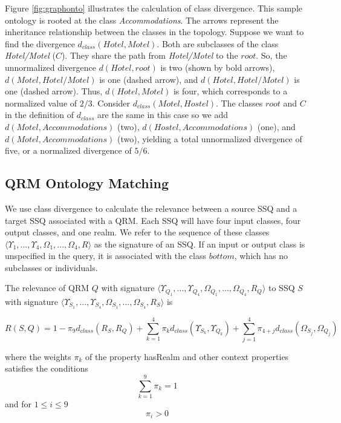 \documentclass{IOS-Book-Article}
\begin{document}
Figure \ref{fig:graphonto} illustrates the calculation of class divergence. This sample ontology is rooted at the class \textit{Accommodations}. The arrows represent the inheritance relationship between the classes in the topology.
Suppose we want to find the divergence $d_{class}(Hotel,Motel)$. Both are subclasses of the class \textit{Hotel/Motel} ($C$). They share the path from \textit{Hotel/Motel} to the $root$. So, the unnormalized divergence $d(Hotel, root)$ is two (shown by bold arrows), $d(Motel, Hotel/Motel)$ is one (dashed arrow), and $d(Hotel, Hotel/Motel)$ is one (dashed arrow). Thus, $d(Hotel, Motel)$ is four, which corresponds to a normalized value of $2/3$. 
Consider $d_{class}(Motel,Hostel)$. The classes $root$ and $C$ in the definition of $d_{class}$ are the same in this case so we add $d(Motel,Accommodations)$ (two), $d(Hostel, Accommodations)$ (one), and $d(Motel,Accommodations)$ (two), yielding a total unnormalized divergence of five, or a normalized divergence of $5/6$.



\subsection{QRM Ontology Matching}
\label{sec:oqom}

We use class divergence to calculate the relevance between a source SSQ and a target SSQ associated with a QRM.  Each SSQ will have four input classes, four output classes, and one realm.  We refer to the sequence of these classes $\langle \Upsilon_1, ..., \Upsilon_4, \Omega_1, ..., \Omega_4, R \rangle$ as the signature of an SSQ. If an input or output class is unspecified in the query, it is associated with the class $bottom$, which has no subclasses or individuals.

The relevance of QRM $Q$ with signature $\langle \Upsilon_{Q_1}, ..., \Upsilon_{Q_4}, \Omega_{Q_1}, ... , \Omega_{Q_4}, R_Q \rangle$ to SSQ $S$ with signature $\langle \Upsilon_{S_1}, ..., \Upsilon_{S_4}, \Omega_{S_1}, ... , \Omega_{S_4}, R_S \rangle$ is

\begin{equation}
\label{qrmsimilarity}
R\left({S,Q}\right) = 1- \pi_9 d_{class}(R_S,R_Q) + \sum_{k=1}^4\pi_k d_{class}(\Upsilon_{S_k},\Upsilon_{Q_k})+ \sum_{j=1}^4\pi_{4+j}d_{class}(\Omega_{S_j},\Omega_{Q_j})
\end{equation}

\noindent where the weights ${\pi}_k$ of the property hasRealm and other context properties satisfies the conditions 
\begin{equation}
\label{piconstraint1}
\sum_{k=1}^{9} {{\pi}_k} = 1
\end{equation}
\noindent and for $1 \leq i \leq 9$
\begin{equation}
\label{piconstraint2}
{\pi}_i > 0
\end{equation}
\end{document}

